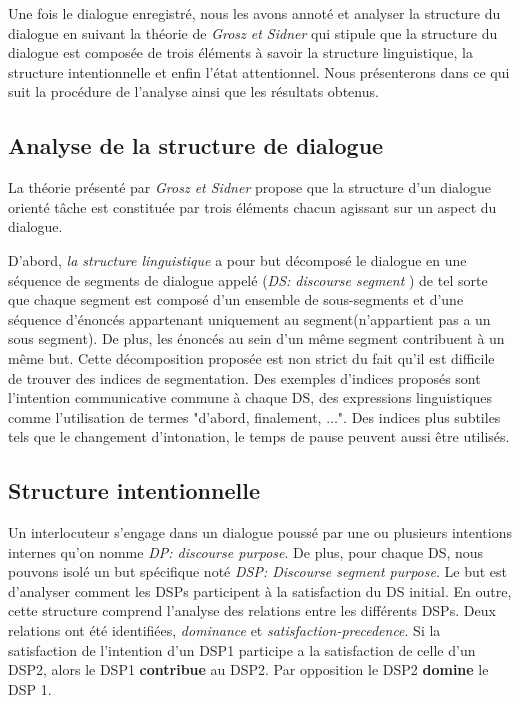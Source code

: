 	Une fois le dialogue enregistré, nous les avons annoté et analyser la structure du dialogue en suivant la théorie de \emph{Grosz et Sidner} \cite{sidner} qui stipule que la structure du dialogue est composée de trois éléments à savoir la structure linguistique, la structure intentionnelle et enfin l'état attentionnel.	
	Nous présenterons dans ce qui suit la procédure de l'analyse ainsi que les résultats obtenus. 
	
	\subsection{Analyse de la structure de dialogue}  
		La théorie présenté par \emph{Grosz et Sidner} propose que la structure d'un dialogue orienté tâche est constituée par trois éléments chacun agissant sur un aspect du dialogue. 
		
		D'abord, \emph{la structure linguistique} a pour but décomposé le dialogue en une séquence de segments de dialogue appelé (\textit{DS: discourse segment }) de tel sorte que chaque segment est composé d'un ensemble de sous-segments et d'une séquence d'énoncés appartenant uniquement au segment(n'appartient pas a un sous segment). De plus, les énoncés au sein d'un même segment contribuent à un même but. Cette décomposition proposée est non strict du fait qu'il est difficile de trouver des indices de segmentation. Des exemples d'indices proposés sont l'intention communicative commune à chaque DS, des expressions  linguistiques comme l'utilisation de termes "d'abord, finalement, $\ldots$". Des indices plus subtiles tels que le changement d'intonation, le temps de pause peuvent aussi être utilisés.
		
	\subsection{Structure intentionnelle}
		Un interlocuteur s'engage dans un dialogue poussé par une ou plusieurs intentions internes qu'on nomme \emph{DP: discourse purpose}. De plus, pour chaque DS, nous pouvons isolé un but spécifique noté \emph{DSP: Discourse segment purpose}. Le but est d'analyser comment les DSPs participent à la satisfaction du DS initial. En outre, cette structure comprend l'analyse des relations entre les différents DSPs. Deux relations ont été identifiées, \emph{dominance} et \emph{satisfaction-precedence}. Si la satisfaction de l'intention d'un DSP1 participe a la satisfaction de celle d'un DSP2, alors le DSP1 \textbf{contribue} au DSP2. Par opposition le DSP2 \textbf{domine} le DSP 1.


